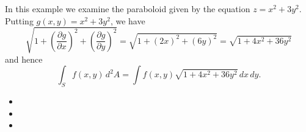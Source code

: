 \documentclass[12pt]{article}
\begin{document}
In this example we examine the paraboloid given by the equation $z = x^2 + 3 y^2$.  Putting $g(x,y) = x^2 + 3 y^2$, we have
 $$\sqrt{1 + \left( \frac{\partial g}{\partial x} \right)^{\!2} + \left( \frac{\partial g}{\partial y} \right)^{\!2}}
= \sqrt{1 + \left( 2 x \right)^2 + \left( 6 y \right)^2}
= \sqrt{1 + 4 x^2 + 36 y^2 }$$
and hence
 $$\int_S f(x,y) \, d^2 A = \int f(x,y) \sqrt{ 1 + 4 x^2 + 36 y^2 } \, dx \, dy.$$

\begin{itemize}
\item {}
\item {}
\item {}
\end{itemize}

\end{document}
